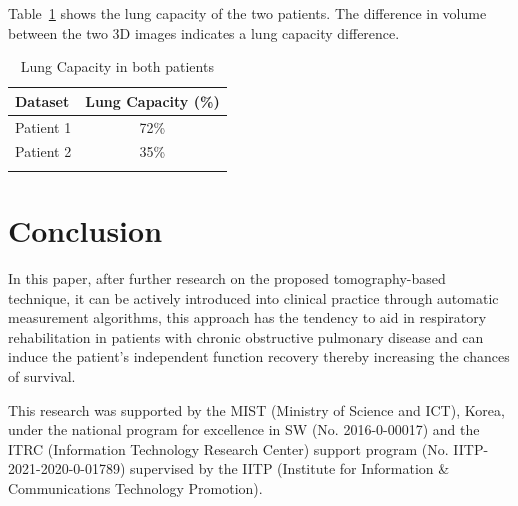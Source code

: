 \documentclass[default]{sn-jnl}
\begin{document}
Table~\ref{tab:lung_capacity} shows the lung capacity of the two patients. The difference in volume between the two 3D
images indicates a lung capacity difference.

\begin{table}[h]
\begin{center}
\caption{Lung Capacity in both patients}\label{tab:lung_capacity}%
\begin{tabular}{@{}lc@{}}
\toprule
Dataset & Lung Capacity (\%) \\
\midrule
Patient 1 & 72\% \\
Patient 2 & 35\% \\
\botrule
\end{tabular}
\end{center}
\end{table}


\section{Conclusion}\label{sec:conclusion}

In this paper, after further research on the proposed tomography-based technique, it can be actively introduced into
clinical practice through automatic measurement algorithms, this approach has the tendency to aid in respiratory
rehabilitation in patients with chronic obstructive pulmonary disease and can induce the patient’s independent function
recovery thereby increasing the chances of survival.

\backmatter


This research was supported by the MIST (Ministry of Science and ICT), Korea, under the national program for excellence
in SW (No. 2016-0-00017) and the ITRC (Information Technology Research Center) support program
(No. IITP-2021-2020-0-01789) supervised by the IITP (Institute for Information & Communications Technology Promotion).




\end{document}
